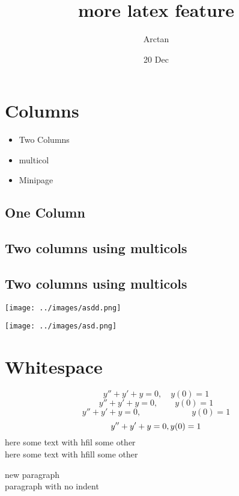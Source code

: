 \documentclass{article}
\title{more latex feature}
\author{Arctan}
\date{20 Dec}
\begin{document}
\maketitle

\section{Columns}
\begin{itemize}
    \item Two Columns
    \item multicol
    \item Minipage
\end{itemize}

\newpage
\onecolumn
\subsection{One Column}
\lipsum[1-2]

\newpage
\subsection{Two columns using multicols}
\begin{multicols}{2}
    \lipsum[1-3]
\end{multicols}

\newpage

\subsection{Two columns using multicols}
\begin{multicols*}{2}
    
    \lipsum[1-3]
\end{multicols*}

\newpage
\begin{minipage}{0.6\textwidth}
    \texttt{[image: ../images/asdd.png]}
\end{minipage}
\hspace{10pt}
\begin{minipage}{0.3\textwidth}
    \texttt{[image: ../images/asd.png]}
\end{minipage}

\newpage
\section{Whitespace}

\[y''+ y'+y=0,\quad y(0)=1\]
\[y'' + y'+y=0, \qquad y(0)=1 \]
\[y'' + y'+y=0, \hspace{1in} y(0)=1 \]
\[y'' + y'+y=0, \hfill y(0)=1 \]
here some text with hfil \hfil some other \\
here some text with hfill \hfill some other

new paragraph\\

\noindent paragraph with no indent
\vfill
\lipsum[1]
\end{document}
